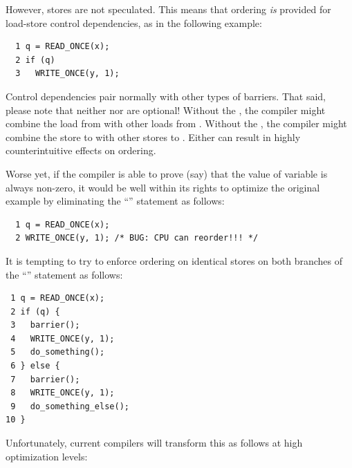 \begin{enumerate}
However, stores are not speculated.
This means that ordering \emph{is} provided for load-store control
dependencies, as in the following example:

\vspace{5pt}
\begin{minipage}[t]{\columnwidth}
\scriptsize
\begin{verbatim}
  1 q = READ_ONCE(x);
  2 if (q)
  3   WRITE_ONCE(y, 1);
\end{verbatim}
\end{minipage}
\vspace{5pt}

Control dependencies pair normally with other types of barriers.
That said, please note that neither  nor 
are optional!
Without the , the compiler might combine the load
from  with other loads from .
Without the , the compiler might combine the store to
 with other stores to .
Either can result in highly counterintuitive effects on ordering.

Worse yet, if the compiler is able to prove (say) that the value of
variable  is always non-zero, it would be well within its rights
to optimize the original example by eliminating the ``'' statement
as follows:

\vspace{5pt}
\begin{minipage}[t]{\columnwidth}
\scriptsize
\begin{verbatim}
  1 q = READ_ONCE(x);
  2 WRITE_ONCE(y, 1); /* BUG: CPU can reorder!!! */
\end{verbatim}
\end{minipage}
\vspace{5pt}

It is tempting to try to enforce ordering on identical stores on both
branches of the ``'' statement as follows:

\vspace{5pt}
\begin{minipage}[t]{\columnwidth}
\scriptsize
\begin{verbatim}
 1 q = READ_ONCE(x);
 2 if (q) {
 3   barrier();
 4   WRITE_ONCE(y, 1);
 5   do_something();
 6 } else {
 7   barrier();
 8   WRITE_ONCE(y, 1);
 9   do_something_else();
10 }
\end{verbatim}
\end{minipage}
\vspace{5pt}

Unfortunately, current compilers will transform this as follows at high
optimization levels:


\end{enumerate}

